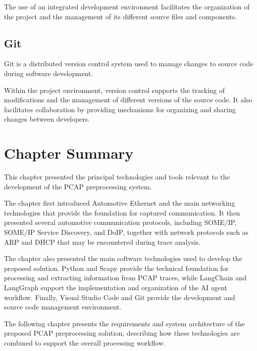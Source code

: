 The use of an integrated development environment facilitates the organization of the project and the management of its different source files and components.

\subsection{Git}

Git is a distributed version control system used to manage changes to source code during software development.

Within the project environment, version control supports the tracking of modifications and the management of different versions of the source code. It also facilitates collaboration by providing mechanisms for organizing and sharing changes between developers.

\section{Chapter Summary}

This chapter presented the principal technologies and tools relevant to the development of the PCAP preprocessing system.

The chapter first introduced Automotive Ethernet and the main networking technologies that provide the foundation for captured communication. It then presented several automotive communication protocols, including SOME/IP, SOME/IP Service Discovery, and DoIP, together with network protocols such as ARP and DHCP that may be encountered during trace analysis.

The chapter also presented the main software technologies used to develop the proposed solution. Python and Scapy provide the technical foundation for processing and extracting information from PCAP traces, while LangChain and LangGraph support the implementation and organization of the AI agent workflow. Finally, Visual Studio Code and Git provide the development and source code management environment.

The following chapter presents the requirements and system architecture of the proposed PCAP preprocessing solution, describing how these technologies are combined to support the overall processing workflow.